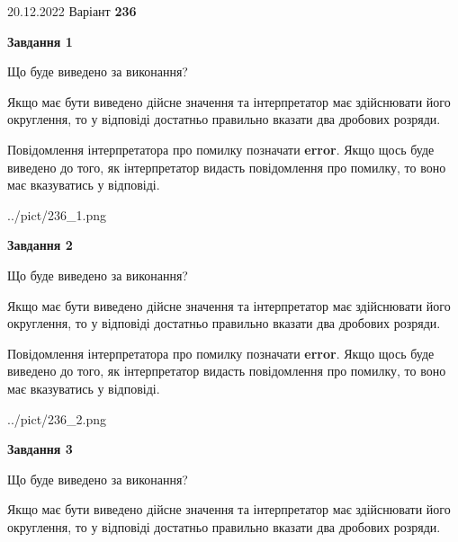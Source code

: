 \documentclass[12pt, ukrainian]{article}
\begin{document}
{20.12.2022 Варіант \No \textbf { 236 }\par}
{
\begin {Large}

{\begin {center}\textbf{Завдання 1}\end {center}}\par
Що буде виведено за виконання? \par

Якщо має бути виведено дійсне значення та інтерпретатор має здійснювати його округлення, 
то у відповіді достатньо правильно вказати два дробових розряди.

Повідомлення інтерпретатора про помилку позначати \textbf{error}.
Якщо щось буде виведено до того, як інтерпретатор видасть повідомлення про помилку, 
то воно має вказуватись у відповіді. \par

\begin{center}
	{../pict/236_1.png}
\end{center}
\newpage

{\begin {center}\textbf{Завдання 2}\end {center}}\par
Що буде виведено за виконання? \par

Якщо має бути виведено дійсне значення та інтерпретатор має здійснювати його округлення, 
то у відповіді достатньо правильно вказати два дробових розряди.

Повідомлення інтерпретатора про помилку позначати \textbf{error}.
Якщо щось буде виведено до того, як інтерпретатор видасть повідомлення про помилку, 
то воно має вказуватись у відповіді. \par

\begin{center}
	{../pict/236_2.png}
\end{center}
\newpage

{\begin {center}\textbf{Завдання 3}\end {center}}\par
Що буде виведено за виконання? \par

Якщо має бути виведено дійсне значення та інтерпретатор має здійснювати його округлення, 
то у відповіді достатньо правильно вказати два дробових розряди.


\end{Large}}
\end{document}
